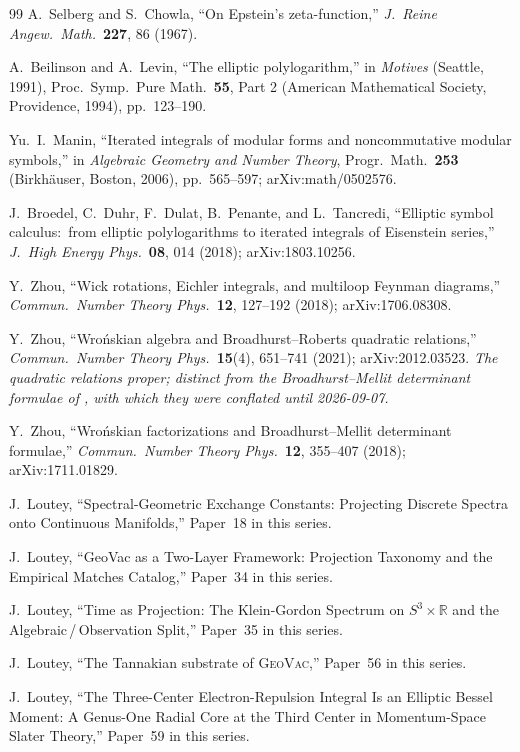 \documentclass[aps,pra,twocolumn,superscriptaddress,longbibliography]{revtex4-2}
\begin{document}
\begin{thebibliography}{99}
A.~Selberg and S.~Chowla, ``On Epstein's zeta-function,''
\textit{J.\ Reine Angew.\ Math.}\ \textbf{227}, 86 (1967).

A.~Beilinson and A.~Levin, ``The elliptic polylogarithm,'' in \textit{Motives}
(Seattle, 1991), Proc.\ Symp.\ Pure Math.\ \textbf{55}, Part 2 (American
Mathematical Society, Providence, 1994), pp.\ 123--190.

Yu.~I.~Manin, ``Iterated integrals of modular forms and noncommutative modular
symbols,'' in \textit{Algebraic Geometry and Number Theory}, Progr.\ Math.\
\textbf{253} (Birkh\"auser, Boston, 2006), pp.\ 565--597; arXiv:math/0502576.

J.~Broedel, C.~Duhr, F.~Dulat, B.~Penante, and L.~Tancredi, ``Elliptic symbol
calculus:\ from elliptic polylogarithms to iterated integrals of Eisenstein
series,'' \textit{J.\ High Energy Phys.}\ \textbf{08}, 014 (2018); arXiv:1803.10256.

Y.~Zhou, ``Wick rotations, Eichler integrals, and multiloop Feynman diagrams,''
\textit{Commun.\ Number Theory Phys.}\ \textbf{12}, 127--192 (2018);
arXiv:1706.08308.

Y.~Zhou, ``Wro\'nskian algebra and Broadhurst--Roberts quadratic
relations,'' \textit{Commun.\ Number Theory Phys.}\ \textbf{15}(4),
651--741 (2021); arXiv:2012.03523. \emph{The quadratic relations proper;
distinct from the Broadhurst--Mellit \emph{determinant} formulae of
\cite{zhou_wronskian2018}, with which they were conflated until
2026-09-07.}

Y.~Zhou, ``Wro\'nskian factorizations and Broadhurst--Mellit determinant
formulae,'' \textit{Commun.\ Number Theory Phys.}\ \textbf{12}, 355--407 (2018);
arXiv:1711.01829.

J.~Loutey, ``Spectral-Geometric Exchange Constants: Projecting Discrete
Spectra onto Continuous Manifolds,'' Paper~18 in this series.

J.~Loutey, ``GeoVac as a Two-Layer Framework: Projection Taxonomy and the
Empirical Matches Catalog,'' Paper~34 in this series.

J.~Loutey, ``Time as Projection: The Klein-Gordon Spectrum on $S^3\times\mathbb{R}$
and the Algebraic\,/\,Observation Split,'' Paper~35 in this series.

J.~Loutey, ``The Tannakian substrate of \textsc{GeoVac},''
Paper~56 in this series.

J.~Loutey, ``The Three-Center Electron-Repulsion Integral Is an Elliptic
Bessel Moment: A Genus-One Radial Core at the Third Center in Momentum-Space Slater
Theory,'' Paper~59 in this series.

\end{thebibliography}
\end{document}
